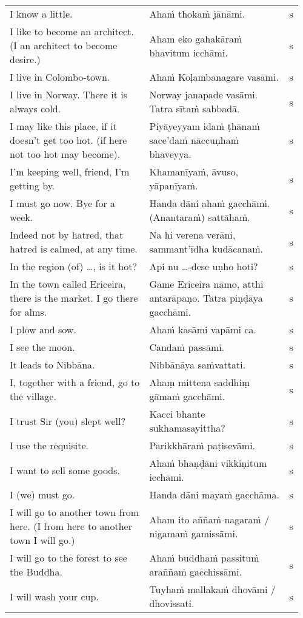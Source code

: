 \documentclass[a5paper]{memoir}
\begin{document}
\begin{longtable}{L{0.48\linewidth} L{0.48\linewidth} H}
I know a little. & Ahaṁ thokaṁ jānāmi. & s\\[0pt]
I like to become an architect. (I an architect to become desire.) & Aham eko gahakāraṁ bhavitum icchāmi. & s\\[0pt]
I live in Colombo-town. & Ahaṁ Koḷambanagare vasāmi. & s\\[0pt]
I live in Norway. There it is always cold. & Norway janapade vasāmi. Tatra sītaṁ sabbadā. & s\\[0pt]
I may like this place, if it doesn't get too hot. (if here not too hot may become). & Piyāyeyyam idaṁ ṭhānaṁ sace'daṁ nāccuṇhaṁ bhaveyya. & s\\[0pt]
I'm keeping well, friend, I'm getting by. & Khamanīyaṁ, āvuso, yāpanīyaṁ. & s\\[0pt]
I must go now. Bye for a week. & Handa dāni ahaṁ gacchāmi. (Anantaraṁ) sattāhaṁ. & s\\[0pt]
Indeed not by hatred, that hatred is calmed, at any time. & Na hi verena verāni, sammant'īdha kudācanaṁ. & s\\[0pt]
In the region (of) \ldots{}, is it hot? & Api nu \ldots{}-dese uṇho hoti? & s\\[0pt]
In the town called Ericeira, there is the market. I go there for alms. & Gāme Ericeira nāmo, atthi antarāpaṇo. Tatra piṇḍāya gacchāmi. & s\\[0pt]
I plow and sow. & Ahaṁ kasāmi vapāmi ca. & s\\[0pt]
I see the moon. & Candaṁ passāmi. & s\\[0pt]
It leads to Nibbāna. & Nibbānāya saṁvattati. & s\\[0pt]
I, together with a friend, go to the village. & Ahaṃ mittena saddhiṃ gāmaṁ gacchāmi. & s\\[0pt]
I trust Sir (you) slept well? & Kacci bhante sukhamasayittha? & s\\[0pt]
I use the requisite. & Parikkhāraṁ paṭisevāmi. & s\\[0pt]
I want to sell some goods. & Ahaṁ bhaṇḍāni vikkiṇitum icchāmi. & s\\[0pt]
I (we) must go. & Handa dāni mayaṁ gacchāma. & s\\[0pt]
I will go to another town from here. (I from here to another town I will go.) & Aham ito aññaṁ nagaraṁ / nigamaṁ gamissāmi. & s\\[0pt]
I will go to the forest to see the Buddha. & Ahaṁ buddhaṁ passituṁ araññaṁ gacchissāmi. & s\\[0pt]
I will wash your cup. & Tuyhaṁ mallakaṁ dhovāmi / dhovissati. & s\\[0pt]

\end{longtable}
\end{document}
